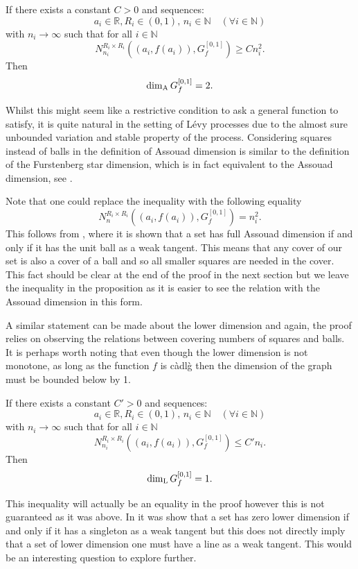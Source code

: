 \begin{proposition}\label{graph}
	If there exists a constant $C>0$ and sequences:
	\[
	a_i\in \mathbb{R},R_i\in (0,1),\, n_i\in\mathbb{N} \quad (\forall i\in \mathbb{N})
	\]
	with $n_i \rightarrow \infty$ such that for all $i\in\mathbb{N}$
	\[
	N_{n_i}^{R_i \times R_i }((a_i,f(a_i)),G_f^{[0,1]})\geq C n_i^2.
	\]
	Then
	\[
	\dim_{\textup{A}} G_f^{[0,1]}=2.
	\]
\end{proposition}

Whilst this might seem like a restrictive condition to ask a general function to satisfy, it is quite natural in the setting of L\'evy processes due to the almost sure unbounded variation and stable property of the process. Considering squares instead of balls in the definition of Assouad dimension is similar to the definition of the Furstenberg star dimension, which is in fact equivalent to the Assouad dimension, see \cite{chenwuwu}.

Note that one could replace the inequality with the following equality
\[
N_{n}^{R_i \times R_i }((a_i,f(a_i)),G_f^{[0,1]})= n_i^2.
\]
This follows from \cite[Theorem 2.4]{FY}, where it is shown that a set has full Assouad dimension if and only if it has the unit ball as a weak tangent. This means that any cover of our set is also a cover of a ball and so all smaller squares are needed in the cover. This fact should be clear at the end of the proof in the next section but we leave the inequality in the proposition as it is easier to see the relation with the Assouad dimension in this form.


A similar statement can be made about the lower dimension and again, the proof relies on observing the relations between covering numbers of squares and balls. It is perhaps worth noting that even though the lower dimension is not monotone, as long as the function $f$ is c\`adl\`g then the dimension of the graph must be bounded below by 1.
\begin{proposition}\label{graph-lower}
	If there exists a constant $C'>0$ and sequences:
	\[
	a_i\in \mathbb{R},R_i\in (0,1),\, n_i\in\mathbb{N} \quad (\forall i\in \mathbb{N})
	\]
	with $n_i \rightarrow \infty$ such that for all $i\in\mathbb{N}$
	\[
	N_{n_i}^{R_i \times R_i }((a_i,f(a_i)),G_f^{[0,1]})\leq C' n_i.
	\]
	Then
	\[
	\dim_{\textup{L}} G_f^{[0,1]}=1.
	\]
\end{proposition}

This inequality will actually be an equality in the proof however this is not guaranteed as it was above. In \cite{microsets} it was show that a set has zero lower dimension if and only if it has a singleton as a weak tangent but this does not directly imply that a set of lower dimension one must have a line as a weak tangent. This would be an interesting question to explore further.

